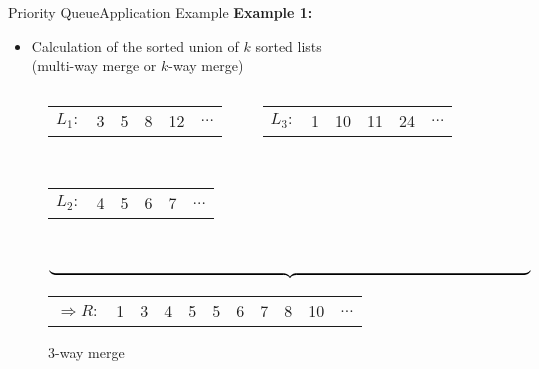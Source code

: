 \begin{frame}{Priority Queue}{Application Example}
  \textbf{Example 1:}
  \begin{itemize}
    \item
      Calculation of the sorted union of $k$ sorted lists\\
      (multi-way merge or $k$-way merge)
  \end{itemize}
  \begin{figure}[!h]
    \begin{columns}
      \begin{column}[t]{0.5\linewidth}
        \begin{tabularx}{\linewidth}{c|X|X|X|X|X|}
          \cline{2-6}
          $L_1:$ & 3 & 5 & 8 & 12 & $\dots$\\
          \cline{2-6}
        \end{tabularx}
        \hfill\\[1.25em]
        \begin{tabularx}{\linewidth}{c|X|X|X|X|X|}
          \cline{2-6}
          $L_2:$ & 4 & 5 & 6 & 7 & $\dots$\\
          \cline{2-6}
        \end{tabularx}
      \end{column}
      \begin{column}[t]{0.5\linewidth}
        \begin{tabularx}{\linewidth}{c|X|X|X|X|X|}
          \cline{2-6}
          $L_3:$ & 1 & 10 & 11 & 24 & $\dots$\\
          \cline{2-6}
        \end{tabularx}
      \end{column}
    \end{columns}
    \hfill\\
    $\underbrace{\hspace{\linewidth}}$\\[0.5em]
    \begin{tabularx}{\linewidth}{c|X|X|X|X|X|X|X|X|X|X|}
      \cline{2-11}
      $\Rightarrow R:$ & 1 & 3 & 4 & 5 & 5 & 6 & 7 & 8 & 10 & $\dots$\\
      \cline{2-11}
    \end{tabularx}
    \caption{3-way merge}
    \label{fig:priority_queue:three_way_merge}
  \end{figure}
\end{frame}


